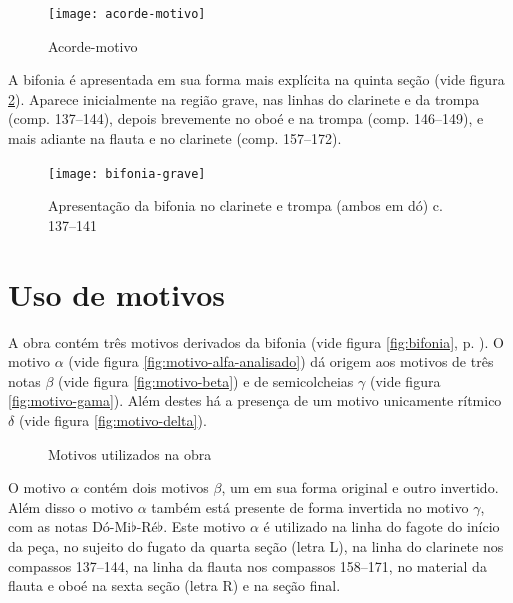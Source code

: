 \begin{figure}
  \centering
  \texttt{[image: acorde-motivo]}
  \caption{Acorde-motivo}
  \label{fig:acorde-motivo}
\end{figure}

A bifonia é apresentada em sua forma mais explícita na quinta seção
(vide figura \ref{fig:bifonia-grave}). Aparece inicialmente na região
grave, nas linhas do clarinete e da trompa (comp. 137--144), depois
brevemente no oboé e na trompa (comp. 146--149), e mais adiante na
flauta e no clarinete (comp. 157--172).

\begin{figure}
  \centering
  \texttt{[image: bifonia-grave]}
  \caption{Apresentação da bifonia no clarinete e trompa (ambos em
    dó) c. 137--141}
  \label{fig:bifonia-grave}
\end{figure}
\section{Uso de motivos}
\label{sec:uso-de-motivos}

A obra contém três motivos derivados da bifonia (vide figura
\ref{fig:bifonia}, p. \pageref{fig:bifonia}). O motivo $\alpha$ (vide
figura \ref{fig:motivo-alfa-analisado}) dá origem aos motivos de três
notas $\beta$ (vide figura \ref{fig:motivo-beta}) e de semicolcheias
$\gamma$ (vide figura \ref{fig:motivo-gama}). Além destes há a
presença de um motivo unicamente rítmico $\delta$ (vide figura
\ref{fig:motivo-delta}).

\begin{figure}
  \centering


  \caption{Motivos utilizados na obra}
  \label{fig:motivos-utilizados}
\end{figure}

O motivo $\alpha$ contém dois motivos $\beta$, um em sua forma
original e outro invertido. Além disso o motivo $\alpha$ também está
presente de forma invertida no motivo $\gamma$, com as notas
Dó-Mi$\flat$-Ré$\flat$. Este motivo $\alpha$ é utilizado na linha do
fagote do início da peça, no sujeito do fugato da quarta seção (letra
L), na linha do clarinete nos compassos 137--144, na linha da flauta
nos compassos 158--171, no material da flauta e oboé na sexta seção
(letra R) e na seção final.

